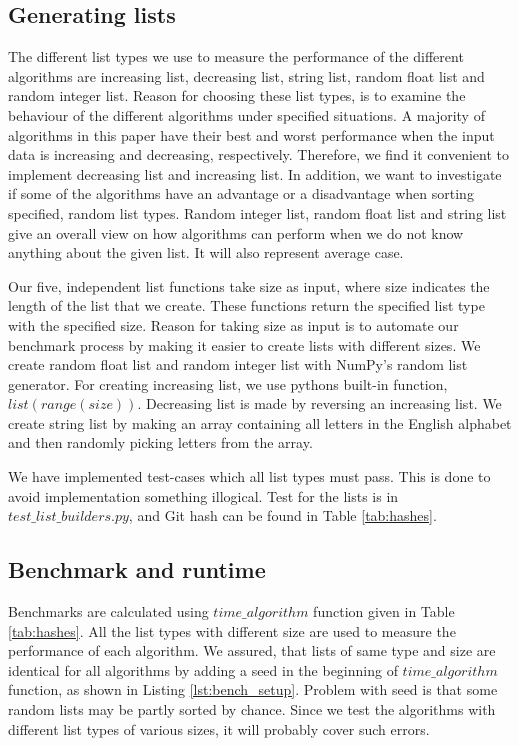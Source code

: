 \documentclass[sigconf, nonacm, natbib, screen, balance=False]{acmart}
\begin{document}
\subsection{Generating lists}

The different list types we use to measure the performance of the different algorithms are increasing list, decreasing list, string list, random float list and random integer list. Reason for choosing these list types, is to examine the behaviour of the different algorithms under specified situations. A majority of algorithms in this paper have their best and worst performance when the input data is increasing and decreasing, respectively. Therefore, we find it convenient to implement decreasing list and increasing list. In addition, we want to investigate if some of the algorithms have an advantage or a disadvantage when sorting specified, random list types. Random integer list, random float list and string list give an overall view on how algorithms can perform when we do not know anything about the given list. It will also represent average case. 

Our five, independent list functions take size as input, where size indicates the length of the list that we create. These functions return the specified list type with the specified size. Reason for taking size as input is to automate our benchmark process by making it easier to create lists with different sizes. We create random float list and random integer list with NumPy’s random list generator. For creating increasing list, we use pythons built-in function, $list(range(size))$. Decreasing list is made by reversing an increasing list. We create string list by making an array containing all letters in the English alphabet and then randomly picking letters from the array. 

We have implemented test-cases which all list types must pass. This is done to avoid implementation something illogical. Test for the lists is in $test\_list\_builders.py$, and Git hash can be found in Table \ref{tab:hashes}.

\subsection{Benchmark and runtime}

Benchmarks are calculated using $time\_algorithm$ function given in Table \ref{tab:hashes}. All the list types with different size are used to measure the performance of each algorithm. We assured, that lists of same type and size are identical for all algorithms by adding a seed in the beginning of $time\_algorithm$ function, as shown in Listing \ref{lst:bench_setup}. Problem with seed is that some random lists may be partly sorted by chance. Since we test the algorithms with different list types of various sizes, it will probably cover such errors. 
\end{document}
